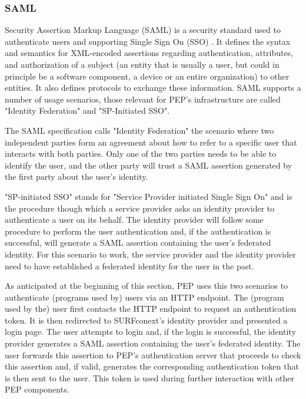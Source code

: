 \documentclass{report}
\begin{document}
\subsubsection{SAML}
Security Assertion Markup Language (SAML) is a security standard used to authenticate users and supporting Single Sign On (SSO) \cite{sstc-saml-core-errata-2.0-wd-07}. It defines
the syntax and semantics for XML-encoded assertions regarding authentication, attributes, and authorization of a subject (an entity that is usually a user, but could in principle
be a software component, a device or an entire organization) to other entities. It also defines protocols to exchange these information. SAML supports a number of usage scenarios, those 
relevant for PEP's infrastructure are called "Identity Federation" and "SP-Initiated SSO". \par
The SAML specification calls "Identity Federation" the scenario where two independent parties form an agreement about how to refer to a specific user that interacts with both
parties. Only one of the two parties needs to be able to identify the user, and the other party will trust a SAML assertion generated by the first party about the user's identity. \par
"SP-initiated SSO" stands for "Service Provider initiated Single Sign On" and is the procedure though which a service provider asks an identity provider to authenticate a user on
its behalf. The identity provider will follow some procedure to perform the user authentication and, if the authentication is successful, will generate a SAML assertion containing
the user's federated identity. For this scenario to work, the service provider and the identity provider need to have established a federated identity for the user in the past.\par
As anticipated at the beginning of this section, PEP uses this two scenarios to authenticate (programs used by) users via an HTTP endpoint. The (program used by the) user first contacts 
the HTTP endpoint to request an authentication token. It is then redirected to SURFconext's identity provider and presented a login page. The user attempts to login and, if the login is 
successful, the identity provider generates a SAML assertion containing the user's federated identity. The user forwards this assertion to PEP's authentication server that proceeds to 
check this assertion and, if valid, generates the corresponding authentication token that is then sent to the user. This token is used during further interaction with other PEP 
components. 
\end{document}
